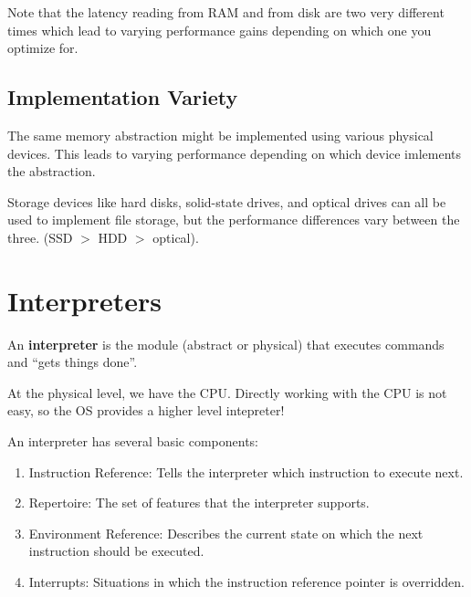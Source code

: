 \documentclass{report}
\begin{document}
Note that the latency reading from RAM and from disk are two very different times which lead to
varying performance gains depending on which one you optimize for.


\subsection*{Implementation Variety}
The same memory abstraction might be implemented using various physical devices. This leads to
varying performance depending on which device imlements the abstraction.

\begin{tcolorbox}[colback=blue!5!white,colframe=black!75!blue,title=Example: Caught in 4k] 
  Storage devices like hard disks, solid-state drives, and optical drives can all be used to
  implement file storage, but the performance differences vary between the three. (SSD $>$
  HDD $>$ optical).
\end{tcolorbox}





\section{Interpreters}

\begin{tcolorbox}[title=Definition: Persistent and Transient Memory]
  An \textbf{interpreter} is the module (abstract or physical) that executes commands and ``gets
  things done''.
\end{tcolorbox}

\begin{tcolorbox}[colback=violet!5!white,colframe=violet,title=Abstraction: Interpreters] 
  At the physical level, we have the CPU. Directly working with the CPU is not easy, so the OS
  provides a higher level intepreter!
\end{tcolorbox}

An interpreter has several basic components: 
\begin{enumerate}[label=\textit{(\roman*)}]
\item Instruction Reference: Tells the interpreter which instruction to execute next.
\item Repertoire: The set of features that the interpreter supports.
\item Environment Reference: Describes the current state on which the next instruction should be
  executed.
\item Interrupts: Situations in which the instruction reference pointer is overridden.
\end{enumerate}
\end{document}
